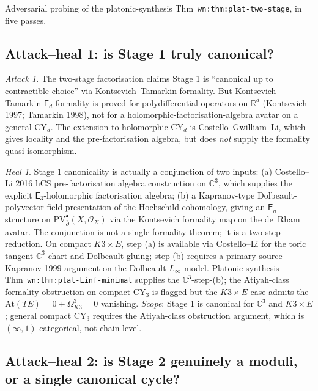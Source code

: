 \documentclass[11pt]{article}
\theoremstyle{definition}
\theoremstyle{remark}
\newtheorem{attack}[theorem]{Attack}
\newtheorem{heal}[theorem]{Heal}
\providecommand{\C}{\mathbb{C}}
\providecommand{\R}{\mathbb{R}}
\providecommand{\cO}{\mathcal{O}}
\providecommand{\Ethree}{\mathsf{E}_3}
\providecommand{\Ed}{\mathsf{E}_d}
\providecommand{\En}{\mathsf{E}_n}
\providecommand{\PV}{\mathrm{PV}}
\providecommand{\dbar}{\bar{\partial}}
\begin{document}
Adversarial probing of the platonic-synthesis
Thm~\texttt{wn:thm:plat-two-stage}, in five passes.

\subsection{Attack--heal 1: is Stage 1 truly canonical?}

\begin{attack}
The two-stage factorisation claims Stage 1 is ``canonical up to
contractible choice'' via Kontsevich--Tamarkin formality. But
Kontsevich--Tamarkin $\Ed$-formality is proved for polydifferential
operators on $\R^d$ (Kontsevich 1997; Tamarkin 1998), not for a
holomorphic-factorisation-algebra avatar on a general CY$_d$. The
extension to holomorphic CY$_d$ is Costello--Gwilliam--Li, which
gives locality and the pre-factorisation algebra, but does \emph{not}
supply the formality quasi-isomorphism.
\end{attack}

\begin{heal}
Stage 1 canonicality is actually a conjunction of two inputs:
(a) Costello--Li 2016 hCS pre-factorisation algebra construction on
$\C^3$, which supplies the explicit $\Ethree$-holomorphic factorisation
algebra; (b) a Kapranov-type Dolbeault-polyvector-field presentation
of the Hochschild cohomology, giving an $\En$-structure on
$\PV^\bullet_{\dbar}(X,\cO_X)$ via the Kontsevich formality map on the
de~Rham avatar. The conjunction is not a single formality theorem;
it is a two-step reduction. On compact $K3\times E$, step (a) is
available via Costello--Li for the toric tangent $\C^3$-chart and
Dolbeault gluing; step (b) requires a primary-source Kapranov 1999
argument on the Dolbeault $L_\infty$-model. Platonic synthesis
Thm~\texttt{wn:thm:plat-Linf-minimal} supplies the $\C^3$-step-(b);
the Atiyah-class formality obstruction on compact CY$_3$ is flagged
but the $K3\times E$ case admits the
$\mathrm{At}(TE) = 0 + \Omega^3_{K3} = 0$ vanishing. \emph{Scope}:
Stage 1 is canonical for $\C^3$ and $K3\times E$; general compact
CY$_3$ requires the Atiyah-class obstruction argument, which is
$(\infty,1)$-categorical, not chain-level.
\end{heal}

\subsection{Attack--heal 2: is Stage 2 genuinely a moduli, or a
single canonical cycle?}
\end{document}
